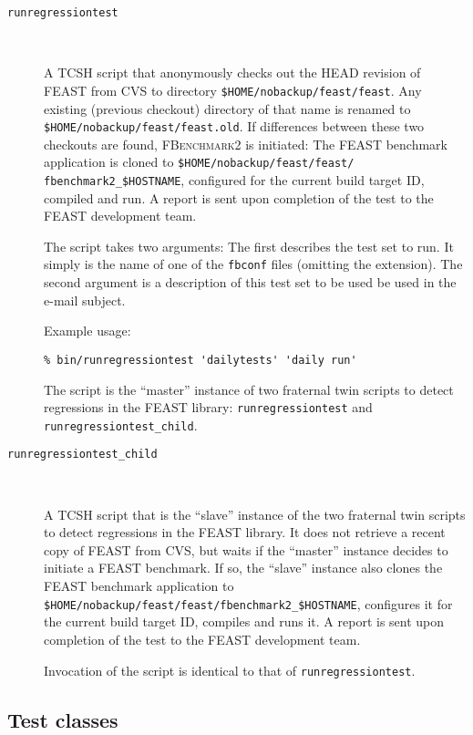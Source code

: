 \begin{description}
\begin{itemize}
\end{itemize}

\item[\texttt{runregressiontest}] \

A TCSH script that anonymously checks out the HEAD revision of FEAST from CVS
to directory \texttt{\$HOME/nobackup/feast/feast}. Any existing (previous checkout)
directory of that name is renamed to \texttt{\$HOME/nobackup/feast/feast.old}. 
If differences between these two checkouts are found, \textsc{FBenchmark2} is
initiated: The FEAST benchmark application is cloned to
\texttt{\$HOME/nobackup/feast/feast/} \texttt{fbenchmark2\_\$HOSTNAME}, 
configured for the current build target ID, compiled and run. A report is sent
upon completion of the test to the FEAST development team.

The script takes two arguments: The first describes the test set to run. It
simply is the name of one of the \texttt{fbconf} files (omitting the
extension). The second argument is a description of this test set to be used  be
used in the e-mail subject.

Example usage:
\begin{verbatim}
% bin/runregressiontest 'dailytests' 'daily run'
\end{verbatim}

The script is the ``master'' instance of two fraternal twin scripts to detect
regressions in the FEAST library:
\texttt{runregressiontest} and \texttt{runregressiontest\_child}.

\item[\texttt{runregressiontest\_child}] \

A TCSH script that is the ``slave'' instance of the two fraternal twin scripts
to detect regressions in the FEAST library. It does not retrieve a recent copy
of FEAST from CVS, but waits if the ``master'' instance decides to initiate a
FEAST benchmark. If so, the ``slave'' instance also clones the FEAST benchmark
application to \texttt{\$HOME/nobackup/feast/feast/fbenchmark2\_\$HOSTNAME},
configures it for the current build target ID, compiles and runs it. A report is
sent upon completion of the test to the FEAST development team.

Invocation of the script is identical to that of \texttt{runregressiontest}.
\end{description}



\subsection{Test classes}
\label{sec:fbenchmark2:test_classes}

